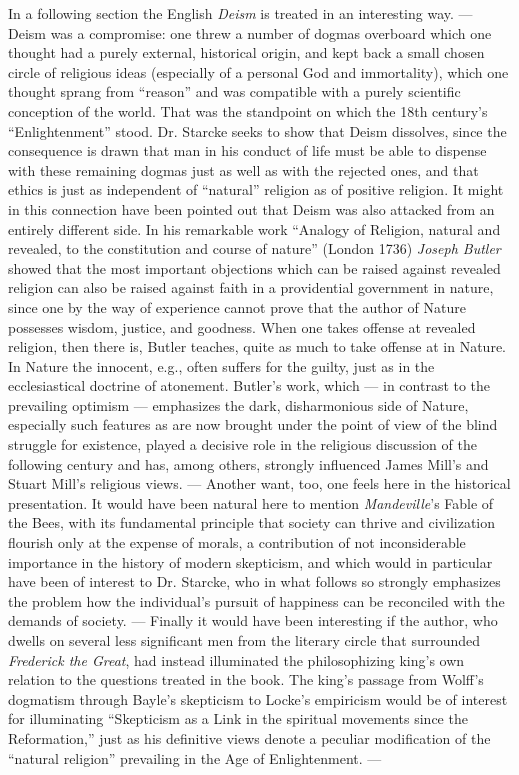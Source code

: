 \documentclass[12pt,a4paper,openany]{book}
\newcommand{\opage}[1]{\marginnote{\footnotesize\textit{[#1]}}}
\begin{document}
In a following section the English \emph{Deism} is treated in
an interesting way. --- Deism was a compromise: one
threw a number of dogmas overboard which one thought had
a purely external, historical origin, and kept back a small
chosen circle of religious ideas (especially of a personal
God and immortality), which one thought sprang from
``reason'' and was compatible with a purely scientific conception of the world. That was the standpoint on which the 18th
century's ``Enlightenment'' stood. Dr. Starcke seeks to show that
Deism dissolves, since the consequence is drawn that man in
his conduct of life must be able to dispense with these remaining dogmas
just as well as with the rejected ones, and that ethics is just as
independent of ``natural'' religion as of positive
religion. It might in this connection have been pointed
out that Deism was also attacked from an entirely different side.
In his remarkable work ``Analogy of Religion, natural and
revealed, to the constitution and course of nature'' (London
1736) \emph{Joseph Butler} showed that the most important objections
which can be raised against revealed religion can also be
raised against faith in a providential government in nature, since one
\opage{24}by the way of experience cannot prove that the author of Nature
possesses wisdom, justice, and goodness. When one takes offense
at revealed religion, then there is, Butler teaches,
quite as much to take offense at in Nature. In Nature the
innocent, e.g., often suffers for the guilty, just as in
the ecclesiastical doctrine of atonement. Butler's work, which --- in
contrast to the prevailing optimism --- emphasizes the
dark, disharmonious side of Nature, especially such features
as are now brought under the point of view of the blind struggle
for existence, played a decisive role in the religious
discussion of the following century and has, among others, strongly
influenced James Mill's and Stuart Mill's religious views.
--- Another want, too, one feels here in the historical
presentation. It would have been natural here to mention
\emph{Mandeville}'s Fable of the Bees, with its fundamental principle that society
can thrive and civilization flourish only at the expense
of morals, a contribution of not inconsiderable importance in the
history of modern skepticism, and which would in particular have
been of interest to Dr. Starcke, who in what follows so
strongly emphasizes the problem how the individual's
pursuit of happiness can be reconciled with the demands of society. --- Finally it would
have been interesting if the author, who dwells on several
less significant men from the literary circle that surrounded
\emph{Frederick the Great}, had instead illuminated
the philosophizing king's own relation to the questions treated in
the book. The king's passage from Wolff's dogmatism
through Bayle's skepticism to Locke's empiricism would be
of interest for illuminating ``Skepticism as a Link in the
spiritual movements since the Reformation,'' just as his
definitive views denote a peculiar modification
of the ``natural religion'' prevailing in the Age of Enlightenment. ---
\end{document}

